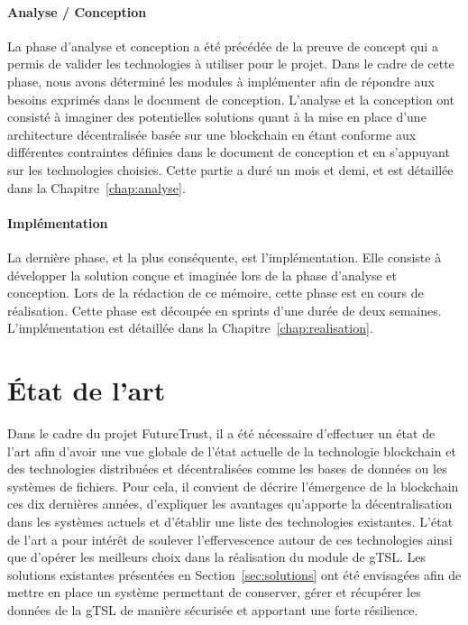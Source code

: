 \documentclass{tnreport}
\begin{document}
\subsubsection{Analyse / Conception}

La phase d'analyse et conception a été précédée de la preuve de concept qui a permis de valider les technologies à utiliser pour le projet. Dans le cadre de cette phase, nous avons déterminé les modules à implémenter afin de répondre aux besoins exprimés dans le document de conception. L'analyse et la conception ont consisté à imaginer des potentielles solutions quant à la mise en place d'une architecture décentralisée basée sur une blockchain en étant conforme aux différentes contraintes définies dans le document de conception et en s'appuyant sur les technologies choisies. Cette partie a duré un mois et demi, et est détaillée dans la Chapitre~\ref{chap:analyse}.

\subsubsection{Implémentation}

La dernière phase, et la plus conséquente, est l'implémentation. Elle consiste à développer la solution conçue et imaginée lors de la phase d'analyse et conception. Lors de la rédaction de ce mémoire, cette phase est en cours de réalisation. Cette phase est découpée en sprints d'une durée de deux semaines. L'implémentation est détaillée dans la Chapitre~\ref{chap:realisation}. 

\chapter{État de l'art}
\label{chap:state-of-the-art}

Dans le cadre du projet FutureTrust, il a été nécessaire d'effectuer un état de l'art afin d'avoir une vue globale de l'état actuelle de la technologie blockchain et des technologies distribuées et décentralisées comme les bases de données ou les systèmes de fichiers. Pour cela, il convient de décrire l'émergence de la blockchain ces dix dernières années, d'expliquer les avantages qu'apporte la décentralisation dans les systèmes actuels et d'établir une liste des technologies existantes. L'état de l'art a pour intérêt de soulever l'effervescence autour de ces technologies ainsi que d'opérer les meilleurs choix dans la réalisation du module de gTSL. Les solutions existantes présentées en Section~\ref{sec:solutions} ont été envisagées afin de mettre en place un système permettant de conserver, gérer et récupérer les données de la gTSL de manière sécurisée et apportant une forte résilience.
\end{document}
